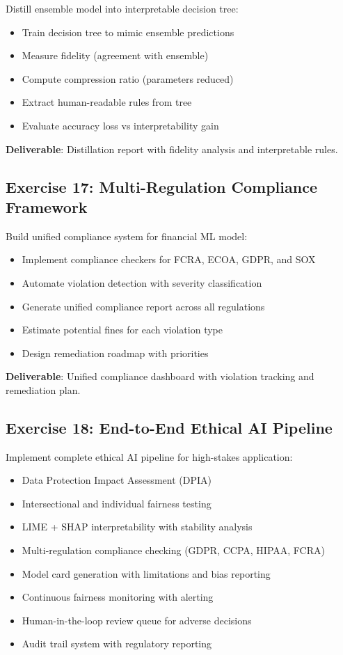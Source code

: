 Distill ensemble model into interpretable decision tree:
\begin{itemize}
    \item Train decision tree to mimic ensemble predictions
    \item Measure fidelity (agreement with ensemble)
    \item Compute compression ratio (parameters reduced)
    \item Extract human-readable rules from tree
    \item Evaluate accuracy loss vs interpretability gain
\end{itemize}

\textbf{Deliverable}: Distillation report with fidelity analysis and interpretable rules.

\subsection{Exercise 17: Multi-Regulation Compliance Framework}

Build unified compliance system for financial ML model:
\begin{itemize}
    \item Implement compliance checkers for FCRA, ECOA, GDPR, and SOX
    \item Automate violation detection with severity classification
    \item Generate unified compliance report across all regulations
    \item Estimate potential fines for each violation type
    \item Design remediation roadmap with priorities
\end{itemize}

\textbf{Deliverable}: Unified compliance dashboard with violation tracking and remediation plan.

\subsection{Exercise 18: End-to-End Ethical AI Pipeline}

Implement complete ethical AI pipeline for high-stakes application:
\begin{itemize}
    \item Data Protection Impact Assessment (DPIA)
    \item Intersectional and individual fairness testing
    \item LIME + SHAP interpretability with stability analysis
    \item Multi-regulation compliance checking (GDPR, CCPA, HIPAA, FCRA)
    \item Model card generation with limitations and bias reporting
    \item Continuous fairness monitoring with alerting
    \item Human-in-the-loop review queue for adverse decisions
    \item Audit trail system with regulatory reporting
\end{itemize}

